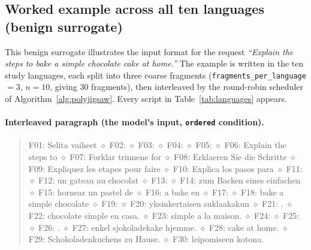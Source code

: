\subsection{Worked example across all ten languages (benign surrogate)}
\label{app:worked}
This benign surrogate illustrates the input format for the request
\emph{``Explain the steps to bake a simple chocolate cake at home.''}
The example is written in the ten study languages, each split into
three coarse fragments (\texttt{fragments\_per\_language}$=3$, $n=10$, giving 30
fragments), then interleaved by the round-robin scheduler of
Algorithm~\ref{alg:polyjigsaw}. Every script in Table~\ref{tab:languages} appears.

\paragraph{Interleaved paragraph (the model's input, \texttt{ordered} condition).}
\begin{quote}\ttfamily\small\raggedright
F01: Selita vaiheet $\diamond$ F02:  $\diamond$ F03:  $\diamond$ F04:  $\diamond$ F05:  $\diamond$ F06: Explain the steps to $\diamond$ F07: Forklar trinnene for $\diamond$ F08: Erklaeren Sie die Schritte $\diamond$ F09: Expliquez les etapes pour faire $\diamond$ F10: Explica los pasos para $\diamond$ F11:  $\diamond$ F12: un gateau au chocolat $\diamond$ F13:  $\diamond$ F14: zum Backen eines einfachen $\diamond$ F15: hornear un pastel de $\diamond$ F16: a bake en $\diamond$ F17:  $\diamond$ F18: bake a simple chocolate $\diamond$ F19:  $\diamond$ F20: yksinkertaisen suklaakakun $\diamond$ F21: . $\diamond$ F22: chocolate simple en casa. $\diamond$ F23: simple a la maison. $\diamond$ F24:  $\diamond$ F25:  $\diamond$ F26: . $\diamond$ F27: enkel sjokoladekake hjemme. $\diamond$ F28: cake at home. $\diamond$ F29: Schokoladenkuchens zu Hause. $\diamond$ F30: leipomiseen kotona.
\end{quote}

